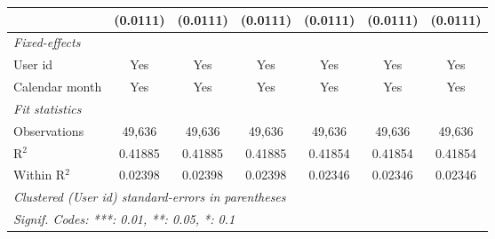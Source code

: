 \begin{table}[htbp]
\begin{footnotesize}
\begin{tabular}{lcccccc}
                                     & (0.0111)       & (0.0111)       & (0.0111)       & (0.0111)       & (0.0111)       & (0.0111)\\
         \midrule \emph{Fixed-effects} &   &   &   &   &   &  \\
         User id                     & Yes            & Yes            & Yes            & Yes            & Yes            & Yes\\
         Calendar month              & Yes            & Yes            & Yes            & Yes            & Yes            & Yes\\
         \midrule \emph{Fit statistics} &   &   &   &   &   &  \\
         Observations                & 49,636         & 49,636         & 49,636         & 49,636         & 49,636         & 49,636\\
         R$^2$                       & 0.41885        & 0.41885        & 0.41885        & 0.41854        & 0.41854        & 0.41854\\
         Within R$^2$                & 0.02398        & 0.02398        & 0.02398        & 0.02346        & 0.02346        & 0.02346\\
         \midrule\midrule\multicolumn{7}{l}{\emph{Clustered (User id) standard-errors in parentheses}}\\
         \multicolumn{7}{l}{\emph{Signif. Codes: ***: 0.01, **: 0.05, *: 0.1}}\\
      \end{tabular}
   \end{footnotesize}
\end{table}


